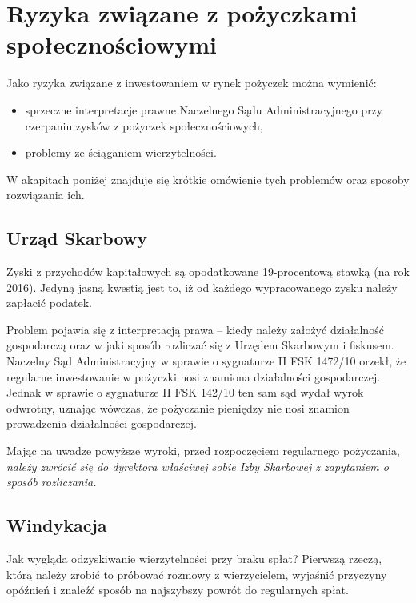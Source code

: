 \documentclass[a4paper,twoside,titlepage,openright]{book}
\begin{document}
 
\section{Ryzyka związane z pożyczkami społecznościowymi}

Jako ryzyka związane z inwestowaniem w rynek pożyczek można wymienić:

\begin{itemize}
\item sprzeczne interpretacje prawne Naczelnego Sądu Administracyjnego przy czerpaniu zysków z pożyczek społecznościowych,
\item problemy ze ściąganiem wierzytelności.
\end{itemize}

W akapitach poniżej znajduje się krótkie omówienie tych problemów oraz sposoby rozwiązania ich.

\subsection*{Urząd Skarbowy}
Zyski z przychodów kapitałowych są opodatkowane 19-procentową stawką (na rok 2016). Jedyną jasną kwestią jest to, iż od każdego wypracowanego zysku należy zapłacić podatek. 

Problem pojawia się z interpretacją prawa -- kiedy należy założyć działalność gospodarczą oraz w jaki sposób rozliczać się z Urzędem Skarbowym i fiskusem. Naczelny Sąd Administracyjny w sprawie o sygnaturze II FSK 1472/10 orzekł, że regularne inwestowanie w pożyczki nosi znamiona działalności gospodarczej.\cite{nsaZnamiona} Jednak w sprawie o sygnaturze II FSK 142/10 ten sam sąd wydał wyrok odwrotny, uznając wówczas, że pożyczanie pieniędzy nie nosi znamion prowadzenia działalności gospodarczej. \cite{nsaWyrokOdwrotny} 

Mając na uwadze powyższe wyroki, przed rozpoczęciem regularnego pożyczania, \emph{należy zwrócić się do dyrektora właściwej sobie Izby Skarbowej z zapytaniem o sposób rozliczania.} \cite{oswiadczenieKokos}

\subsection*{Windykacja}

Jak wygląda odzyskiwanie wierzytelności przy braku spłat? Pierwszą rzeczą, którą należy zrobić to próbować rozmowy z wierzycielem, wyjaśnić przyczyny opóźnień i znaleźć sposób na najszybszy powrót do regularnych spłat. 
\end{document}

